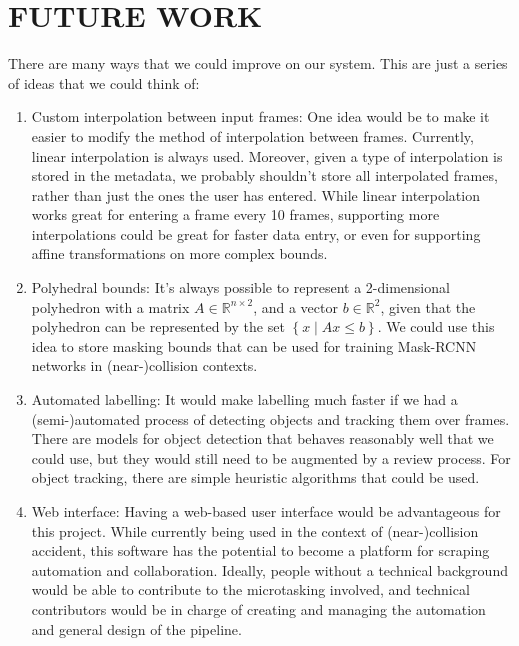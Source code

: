 \documentclass[letterpaper, 10 pt, conference]{IEEEconf}
\begin{document}
\section{FUTURE WORK}

There are many ways that we could improve on our system. This are just a series of ideas that we could think of:
\begin{enumerate}
\item Custom interpolation between input frames: One idea would be to make it easier to modify the method of interpolation between frames. Currently, linear interpolation is always used. Moreover, given a type of interpolation is stored in the metadata, we probably shouldn't store all interpolated frames, rather than just the ones the user has entered. While linear interpolation works great for entering a frame every 10 frames, supporting more interpolations could be great for faster data entry, or even for supporting affine transformations on more complex bounds.

\item Polyhedral bounds: It's always possible to represent a 2-dimensional polyhedron with a matrix $A\in\mathbb{R}^{n\times 2}$, and a vector $b\in\mathbb{R}^2$, given that the polyhedron can be represented by the set $\left\{x\mid Ax\leq b\right\}$. We could use this idea to store masking bounds that can be used for training Mask-RCNN networks in (near-)collision contexts. 

\item Automated labelling: It would make labelling much faster if we had a (semi-)automated process of detecting objects and tracking them over frames. There are models for object detection that behaves reasonably well that we could use, but they would still need to be augmented by a review process. For object tracking, there are simple heuristic algorithms that could be used. 

\item Web interface: Having a web-based user interface would be advantageous for this project. While currently being used in the context of (near-)collision accident, this software has the potential to become a platform for scraping automation and collaboration. Ideally, people without a technical background would be able to contribute to the microtasking involved, and technical contributors would be in charge of creating and managing the automation and general design of the pipeline.

\end{enumerate}

\addtolength{\textheight}{-12cm}



\nocite{*}
\printbibliography
\end{document}
